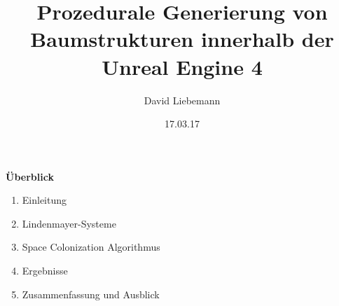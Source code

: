 \documentclass[20pt,landscape]{extarticle}
\title{Prozedurale Generierung von Baumstrukturen innerhalb der Unreal Engine 4}
\author{David Liebemann}
\date{17.03.17}
\begin{document}
\mytitlepage

\newpage
\noindent
{\Large \textbf{Überblick}} 
\slidetitle{}
\begin{enumerate}
	\item Einleitung 
	\item Lindenmayer-Systeme
	\item Space Colonization Algorithmus
	\item Ergebnisse
	\item Zusammenfassung und Ausblick
\end{enumerate}





%







\end{document}
